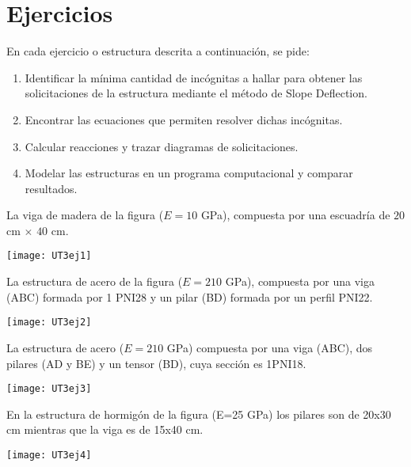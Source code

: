 \section{Ejercicios}
\setcounter{ejercicio}{0}

En cada ejercicio o estructura descrita a continuación, se pide:
%
\begin{enumerate}
  \item Identificar la mínima cantidad de incógnitas a hallar para obtener las solicitaciones de la estructura mediante el método de Slope Deflection.
  \item  Encontrar las ecuaciones que permiten resolver dichas incógnitas.
  \item  Calcular reacciones y trazar diagramas de solicitaciones.
  \item  Modelar las estructuras en un programa computacional y comparar resultados.
\end{enumerate}

\ejercicio

La viga de madera de la figura ($E=10$ GPa), compuesta por una escuadría de $20$ cm $\times$ $40$ cm.

\begin{center}
	\texttt{[image: UT3ej1]}
\end{center}


\ejercicio

La estructura de acero de la figura ($E=210$ GPa), compuesta por una viga (ABC) formada por 1 PNI28 y un pilar (BD) formada por un perfil PNI22.

\begin{center}
	\texttt{[image: UT3ej2]}
\end{center}


\ejercicio

La estructura de acero ($E=210$ GPa) compuesta por una viga (ABC), dos pilares (AD y BE) y un tensor (BD), cuya sección es 1PNI18.

\begin{center}
	\texttt{[image: UT3ej3]}
\end{center}

\ejercicio

En la estructura de hormigón de la figura (E=25 GPa) los pilares son de 20x30 cm mientras que la viga es de 15x40 cm. 

\begin{center}
	\texttt{[image: UT3ej4]}
\end{center}


